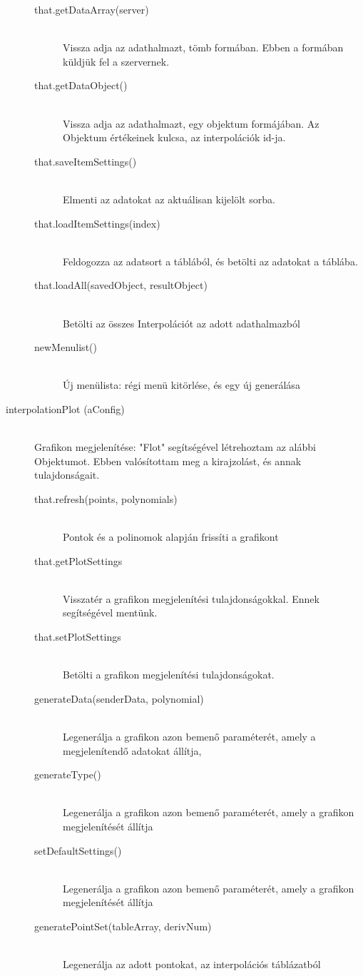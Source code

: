 \begin{description}
\begin{description}
			\item[that.getDataArray(server)] 
			\hfill \\ Vissza adja az adathalmazt, tömb formában. Ebben a formában küldjük fel a szervernek.
			\item[that.getDataObject()] 
			\hfill \\ Vissza adja az adathalmazt, egy objektum formájában. Az Objektum értékeinek kulcsa, az interpolációk id-ja.
			\item[that.saveItemSettings()] 
			\hfill \\ Elmenti az adatokat az aktuálisan kijelölt sorba.
			\item[that.loadItemSettings(index)]
			\hfill \\ Feldogozza az adatsort a táblából, és betölti az adatokat a táblába.
			\item[that.loadAll(savedObject, resultObject)] 
			\hfill \\Betölti az összes Interpolációt az adott adathalmazból
			\item[newMenulist()] 
			\hfill \\
			Új menülista: régi menü kitörlése, és egy új generálása
			\hfill \\ 
			\end{description}
		\item[interpolationPlot (aConfig)]
			\hfill \\ Grafikon megjelenítése: "Flot" segítségével létrehoztam az alábbi Objektumot. Ebben valósítottam meg a kirajzolást, és annak tulajdonságait.
			\begin{description}
			\item[that.refresh(points, polynomials)]
			\hfill \\ Pontok és a polinomok alapján frissíti a grafikont
			\item[that.getPlotSettings]
			\hfill \\ Visszatér a grafikon megjelenítési tulajdonságokkal. Ennek segítségével mentünk.
			\item[that.setPlotSettings]
			\hfill \\ Betölti a grafikon megjelenítési tulajdonságokat.
			\item[generateData(senderData, polynomial)]
			\hfill \\ Legenerálja a grafikon azon bemenő paraméterét, amely a megjelenítendő adatokat állítja,

			\item[generateType()]
			\hfill \\ Legenerálja a grafikon azon bemenő paraméterét, amely a grafikon megjelenítését állítja
			\item[setDefaultSettings()]
			\hfill \\ Legenerálja a grafikon azon bemenő paraméterét, amely a grafikon megjelenítését állítja
			\item[generatePointSet(tableArray, derivNum)]
			\hfill \\ Legenerálja az adott pontokat, az interpolációs táblázatból
			\end{description}


\end{description}
